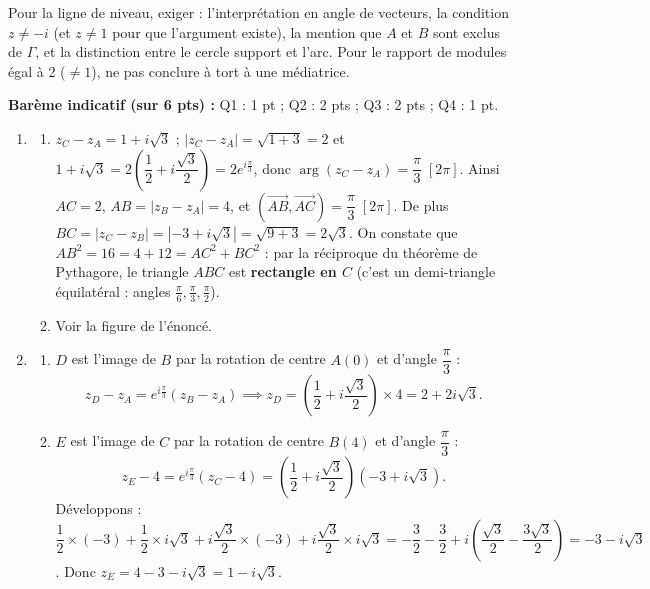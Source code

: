 \documentclass[11pt]{article}
\begin{document}
\begin{attention}
Pour la ligne de niveau, exiger : l'interprétation en angle de vecteurs, la condition $z \neq -i$ (et $z \neq 1$ pour que l'argument existe), la mention que $A$ et $B$ sont exclus de $\Gamma$, et la distinction entre le cercle support et l'arc. Pour le rapport de modules égal à 2 ($\neq 1$), ne pas conclure à tort à une médiatrice.
\end{attention}

\begin{corrige}
\textbf{Barème indicatif (sur 6 pts) :} Q1 : 1 pt ; Q2 : 2 pts ; Q3 : 2 pts ; Q4 : 1 pt.

\begin{enumerate}
\item \begin{enumerate}
\item $z_C - z_A = 1 + i\sqrt{3}$ ; $|z_C - z_A| = \sqrt{1 + 3} = 2$ et $1 + i\sqrt{3} = 2\left(\dfrac{1}{2} + i\dfrac{\sqrt{3}}{2}\right) = 2e^{i\frac{\pi}{3}}$, donc $\arg(z_C - z_A) = \dfrac{\pi}{3}\;[2\pi]$. Ainsi $AC = 2$, $AB = |z_B - z_A| = 4$, et $\left(\overrightarrow{AB}, \overrightarrow{AC}\right) = \dfrac{\pi}{3}\;[2\pi]$. De plus $BC = |z_C - z_B| = |-3 + i\sqrt{3}| = \sqrt{9 + 3} = 2\sqrt{3}$. On constate que $AB^2 = 16 = 4 + 12 = AC^2 + BC^2$ : par la réciproque du théorème de Pythagore, le triangle $ABC$ est \textbf{rectangle en $C$} (c'est un demi-triangle équilatéral : angles $\frac{\pi}{6}, \frac{\pi}{3}, \frac{\pi}{2}$).
\item Voir la figure de l'énoncé.
\end{enumerate}
\item \begin{enumerate}
\item $D$ est l'image de $B$ par la rotation de centre $A(0)$ et d'angle $\dfrac{\pi}{3}$ :
\[ z_D - z_A = e^{i\frac{\pi}{3}}(z_B - z_A) \implies z_D = \left(\frac{1}{2} + i\frac{\sqrt{3}}{2}\right) \times 4 = 2 + 2i\sqrt{3}. \]
\item $E$ est l'image de $C$ par la rotation de centre $B(4)$ et d'angle $\dfrac{\pi}{3}$ :
\[ z_E - 4 = e^{i\frac{\pi}{3}}(z_C - 4) = \left(\frac{1}{2} + i\frac{\sqrt{3}}{2}\right)(-3 + i\sqrt{3}). \]
Développons : $\dfrac{1}{2} \times (-3) + \dfrac{1}{2} \times i\sqrt{3} + i\dfrac{\sqrt{3}}{2} \times (-3) + i\dfrac{\sqrt{3}}{2} \times i\sqrt{3} = -\dfrac{3}{2} - \dfrac{3}{2} + i\left(\dfrac{\sqrt{3}}{2} - \dfrac{3\sqrt{3}}{2}\right) = -3 - i\sqrt{3}$. Donc $z_E = 4 - 3 - i\sqrt{3} = 1 - i\sqrt{3}$.

\end{enumerate}
\end{enumerate}
\end{corrige}
\end{document}
